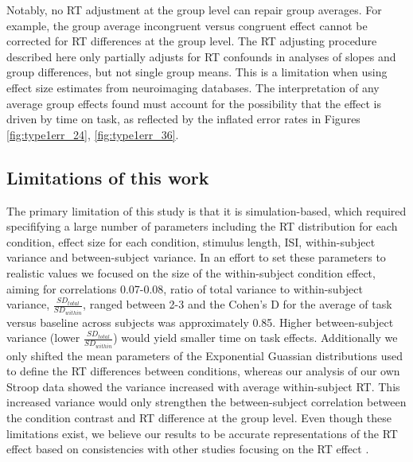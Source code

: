 \documentclass[titlepage,12pt] {article}
\begin{document}
Notably, no RT adjustment at the group level can repair group averages. For example, the group average incongruent versus congruent effect cannot be corrected for RT differences at the group level. The RT adjusting procedure described here only partially adjusts for RT confounds in analyses of slopes and group differences, but not single group means. This is a limitation when using effect size estimates from neuroimaging databases. The interpretation of any average group effects found must account for the possibility that the effect is driven by time on task, as reflected by the inflated error rates in Figures \ref{fig:type1err_24}, \ref{fig:type1err_36}.

 


\subsection*{Limitations of this work}
The primary limitation of this study is that it is simulation-based, which required specififying a large number of parameters including the RT distribution for each condition, effect size for each condition, stimulus length, ISI,  within-subject variance and between-subject variance.  In an effort to set these parameters to realistic values we focused on the size of the within-subject condition effect, aiming for correlations 0.07-0.08, ratio of total variance to within-subject variance, $\frac{SD_{total}}{SD_{within}}$,  ranged between 2-3 and the Cohen's D for the average of task versus baseline across subjects was approximately 0.85.  Higher between-subject variance (lower $\frac{SD_{total}}{SD_{within}}$) would yield smaller time on task effects.  Additionally we only shifted the mean parameters of the Exponential Guassian distributions used to define the RT differences between conditions, whereas our analysis of our own Stroop data showed the variance increased with average within-subject RT.  This increased variance would only strengthen the between-subject correlation between the condition contrast and RT difference at the group level.   Even though these limitations exist, we believe our results to be accurate representations of the RT effect based on consistencies with other studies focusing on the RT effect \citep{yarkoni_bold_2009, brown_medial_2011, grinband_dorsal_2011}.  %
\end{document}
